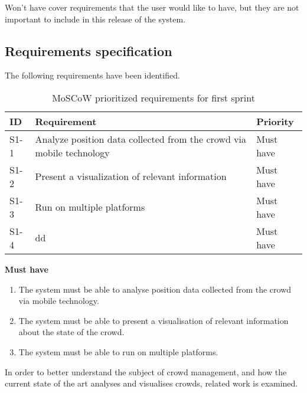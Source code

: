Won't have cover requirements that the user would like to have, but they are not important to include in this release of the system.

\subsection{Requirements specification}

The following requirements have been identified.

\begin{table}[h!]
	\centering
	\begin{tabularx}{\textwidth}{lXl}
		\toprule
		\textbf{ID} & \textbf{Requirement} & \textbf{Priority} \\
		\midrule 
		\rowcolor[HTML]{EFEFEF} 
		S1-1  & Analyze position data collected from the crowd via mobile technology    & Must have \\
		S1-2  & Present a visualization of relevant information                         & Must have \\
		\rowcolor[HTML]{EFEFEF} 
		S1-3  & Run on multiple platforms                                               & Must have \\
		S1-4  & dd                                                                      & Must have \\
		\bottomrule
	\end{tabularx}
	\caption{MoSCoW prioritized requirements for first sprint}
	\label{tab:s1_req}
\end{table}


\textbf{Must have}
\begin{enumerate}
    \item The system must be able to analyse position data collected from the crowd via mobile technology.
    \item The system must be able to present a visualisation of relevant information about the state of the crowd.
    \item The system must be able to run on multiple platforms.
\end{enumerate}

In order to better understand the subject of crowd management, and how the current state of the art analyses and visualises crowds, related work is examined.

